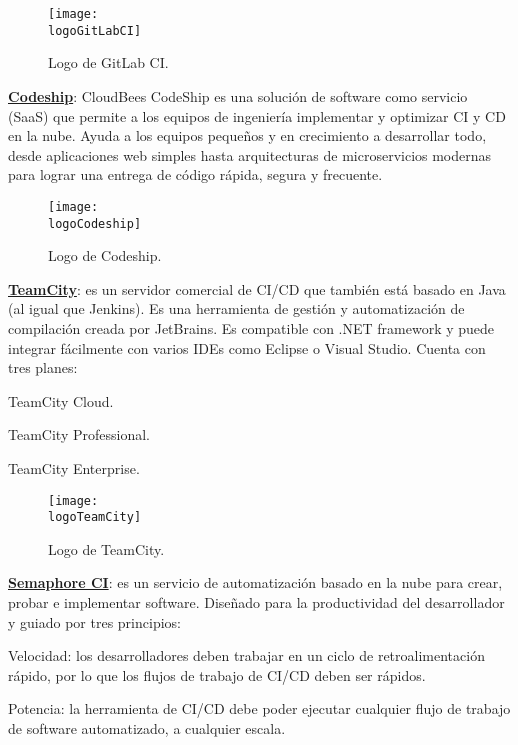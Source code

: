 \begin{compactitem}
    \begin{figure}[h]
        \centering
        \texttt{[image: \\logoGitLabCI]}
        \caption{Logo de GitLab CI.}
    \end{figure}
    \item \textbf{\underline{Codeship}}: CloudBees CodeShip es una solución de software como servicio (SaaS) que permite a los equipos de ingeniería implementar y optimizar CI y CD en la nube. Ayuda a los equipos pequeños y en crecimiento a desarrollar todo, desde aplicaciones web simples hasta arquitecturas de microservicios modernas para lograr una entrega de código rápida, segura y frecuente.
    \begin{figure}[h]
        \centering
        \texttt{[image: \\logoCodeship]}
        \caption{Logo de Codeship.}
    \end{figure}
    \item \textbf{\underline{TeamCity}}: es un servidor comercial de CI/CD que también está basado en Java (al igual que Jenkins). Es una herramienta de gestión y automatización de compilación creada por JetBrains.
    Es compatible con .NET framework y puede integrar fácilmente con varios IDEs como Eclipse o Visual Studio.
    Cuenta con tres planes:
    \begin{compactitem}
        \item TeamCity Cloud.
        \item TeamCity Professional.
        \item TeamCity Enterprise.
    \end{compactitem}
    \begin{figure}[h]
        \centering
        \texttt{[image: \\logoTeamCity]}
        \caption{Logo de TeamCity.}
    \end{figure}
    \item \textbf{\underline{Semaphore CI}}: es un servicio de automatización basado en la nube para crear, probar e implementar software. Diseñado para la productividad del desarrollador y guiado por tres principios:
    \begin{compactitem}
        \item Velocidad: los desarrolladores deben trabajar en un ciclo de retroalimentación rápido, por lo que los flujos de trabajo de CI/CD deben ser rápidos.
        \item Potencia: la herramienta de CI/CD debe poder ejecutar cualquier flujo de trabajo de software automatizado, a cualquier escala.

\end{compactitem}
\end{compactitem}
